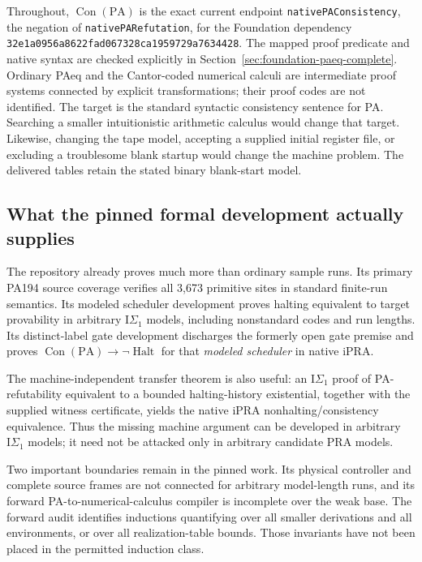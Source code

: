 \documentclass[11pt,a4paper]{article}
\newcommand{\PA}{\mathrm{PA}}
\newcommand{\Con}{\operatorname{Con}}
\newcommand{\Halt}{\operatorname{Halt}}
\newcommand{\IS}{\mathrm{I}\Sigma_1}
\newcommand{\file}[1]{\texttt{\nolinkurl{#1}}}
\begin{document}
Throughout, $\Con(\PA)$ is the exact current endpoint
\file{nativePAConsistency}, the negation of
\file{nativePARefutation}, for the Foundation dependency
\file{32e1a0956a8622fad067328ca1959729a7634428}.
The mapped proof predicate and native syntax are checked explicitly in
Section~\ref{sec:foundation-paeq-complete}. Ordinary PAeq and the
Cantor-coded numerical calculi are intermediate proof systems connected
by explicit transformations; their proof codes are not identified.
The target is the standard syntactic consistency sentence for PA. Searching
a smaller intuitionistic arithmetic calculus would change that target.
Likewise, changing the tape model, accepting a supplied initial register
file, or excluding a troublesome blank startup would change the machine
problem. The delivered tables retain the stated binary blank-start model.

\subsection{What the pinned formal development actually supplies}

The repository already proves much more than ordinary sample runs.
Its primary PA194 source coverage verifies all 3,673 primitive sites in
standard finite-run semantics. Its modeled scheduler development proves
halting equivalent to target provability in arbitrary $\IS$ models,
including nonstandard codes and run lengths. Its distinct-label gate
development discharges the formerly open gate premise and proves
$\Con(\PA)\to\neg\Halt$ for that \emph{modeled scheduler}
in native iPRA\cite{pa-status,fairness,gate}.

The machine-independent transfer theorem is also useful: an $\IS$
proof of PA-refutability equivalent to a bounded halting-history
existential, together with the supplied witness certificate, yields the
native iPRA nonhalting/consistency equivalence. Thus the missing machine
argument can be developed in arbitrary $\IS$ models; it need not be
attacked only in arbitrary candidate PRA models\cite{transfer}.

Two important boundaries remain in the pinned work. Its physical
controller and complete source frames are not connected for arbitrary
model-length runs, and its forward PA-to-numerical-calculus compiler is
incomplete over the weak base. The forward audit identifies inductions
quantifying over all smaller derivations and all environments, or over
all realization-table bounds. Those invariants have not been placed in
the permitted induction class\cite{forward}.
\end{document}
